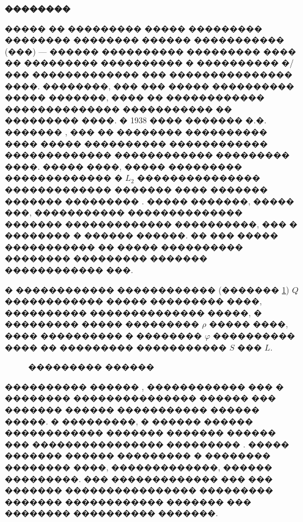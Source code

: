 \documentclass[a4paper]{article}
\begin{document}
\begin{center}
  {\bf ��������}
\end{center}

����� �� ��������� ����� ��������� ��������  �������� ������ ����������� (���) --- ������ ����������
��������� ���� �� ��������� ���������� � ���������� �/��� ������������� ��� ��������������� ����. ��������, ���  ��� ����� ���������� ����� �������, ���� �� ������������ �������������� ����������� �� ��������� ����. � 1938 ���� ������� �.�. ������� \cite{nov}, ��� �� �������� ���������� ���� ����� ���������� ������������ ������������� ������������ ��������� ����. ����� ����, ����� ��������� ������������� � $L_2$ ��������������� ������������� ������� ���� ������� ������� ���������  \cite{nov}.  ����� �������, ����� ���, ����������� �������������� ������� ������������� ����������, ��� � �������� � ������ ������. �� ��� ����� ����������� �� ����� ���������� �������� ��������� ������� ������������ ���.

� ������������ ������������ (������� \ref{first}) $Q$ ������������ ����� ��������� ����,
���������� �������������� �����, � ��������� ����� ��������� $\rho$ ����� ����,
���� ���������� � �������� $\varphi$ ���������� ���� �� ��������� ����������� $S$ ��� $L$.
\begin{figure}[h!]
  \noindent{}
  \caption{��������� ������}
  \label{first}
\end{figure}

���������� ������ \cite{lezh,lezh2}, ������������ ��� � �������� ��������������� ������ ��� ������� ������ ����������� ������ �����.
� ���������, � ������ ������ ������������ ������� ������� ������ ��� ���������������� ���������  \cite{lezh,lezh2}. ����� ������� ������ ��������� � �������� �������� ����, �������������,
������ ���������. ��� ������������� ��� ��� ������� ���������������� ��������� ������� ������������ ������� ��� �������� ���������� �������. 
\end{document}
